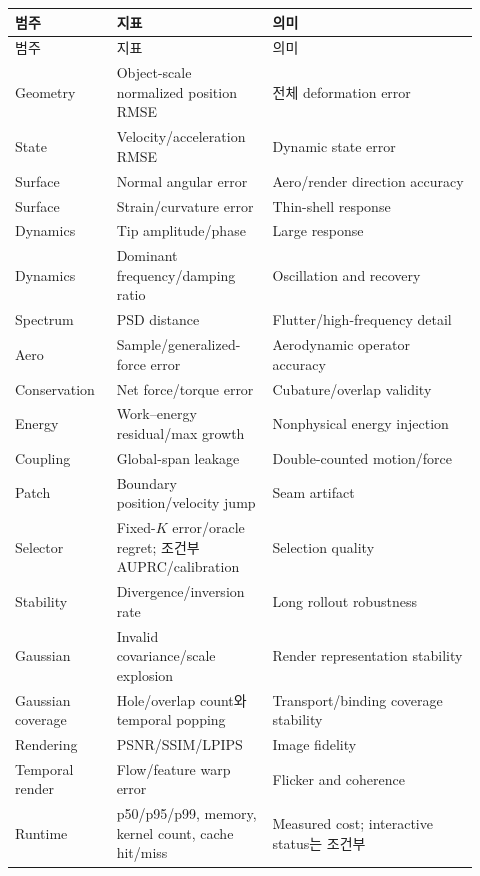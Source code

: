 \documentclass[11pt,a4paper]{article}
\begin{document}
\begin{longtable}{L{0.20\linewidth}L{0.31\linewidth}L{0.41\linewidth}}
\toprule
범주 & 지표 & 의미 \\
\midrule
\endfirsthead
\toprule
범주 & 지표 & 의미 \\
\midrule
\endhead
Geometry & Object-scale normalized position RMSE & 전체 deformation error \\
\addlinespace
State & Velocity/acceleration RMSE & Dynamic state error \\
\addlinespace
Surface & Normal angular error & Aero/render direction accuracy \\
\addlinespace
Surface & Strain/curvature error & Thin-shell response \\
\addlinespace
Dynamics & Tip amplitude/phase & Large response \\
\addlinespace
Dynamics & Dominant frequency/damping ratio & Oscillation and recovery \\
\addlinespace
Spectrum & PSD distance & Flutter/high-frequency detail \\
\addlinespace
Aero & Sample/generalized-force error & Aerodynamic operator accuracy \\
\addlinespace
Conservation & Net force/torque error & Cubature/overlap validity \\
\addlinespace
Energy & Work--energy residual/max growth & Nonphysical energy injection \\
\addlinespace
Coupling & Global-span leakage & Double-counted motion/force \\
\addlinespace
Patch & Boundary position/velocity jump & Seam artifact \\
\addlinespace
Selector & Fixed-\(K\) error/oracle regret; 조건부 AUPRC/calibration & Selection quality \\
\addlinespace
Stability & Divergence/inversion rate & Long rollout robustness \\
\addlinespace
Gaussian & Invalid covariance/scale explosion & Render representation stability \\
\addlinespace
Gaussian coverage & Hole/overlap count와 temporal popping & Transport/binding coverage stability \\
\addlinespace
Rendering & PSNR/SSIM/LPIPS & Image fidelity \\
\addlinespace
Temporal render & Flow/feature warp error & Flicker and coherence \\
\addlinespace
Runtime & p50/p95/p99, memory, kernel count, cache hit/miss & Measured cost; interactive status는 조건부 \\
\bottomrule
\end{longtable}
\end{document}
